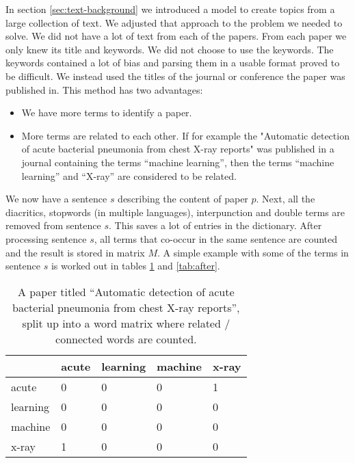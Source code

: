 
In section \ref{sec:text-background} we introduced a model to create topics from a large collection of text. We adjusted that approach to the problem we needed to solve. We did not have a lot of text from each of the papers. From each paper we only knew its title and keywords.
We did not choose to use the keywords.
The keywords contained a lot of bias and parsing them in a usable format proved to be difficult.
We instead used the titles of the journal or conference the paper was published in.
This method has two advantages:

\begin{itemize}
\item[1] We have more terms to identify a paper.
\item[2] More terms are related to each other. If for example the "Automatic detection of acute bacterial pneumonia from chest X-ray reports" was published in a journal containing the terms ``machine learning'', then the terms ``machine learning'' and ``X-ray'' are considered to be related. 
\end{itemize}

We now have a sentence $s$ describing the content of paper $p$.
Next, all the diacritics, stopwords (in multiple languages), interpunction and double terms are removed from sentence $s$.
This saves a lot of entries in the dictionary\cite{chowdhury2010introduction}.
After processing sentence $s$, all terms that co-occur in the same sentence are counted and the result is stored in matrix $M$.
A simple example with some of the terms in sentence $s$ is worked out in tables \ref{tab:before} and \ref{tab:after}.

\begin{table}
	\begin{center}
	

\begin{tabular}{|l|l|l|l|l|}
\hline
	 	& acute  & learning & machine &  x-ray \\ \hline
acute 	&	0 	& 	0 &	 0 &  1	 \\ \hline
learning&	0	&	0 &	 0 &  0	 \\ \hline
machine &	0	&	0 &	 0 &  0	 \\ \hline
x-ray	&	1	&	0 &	 0 &  0	 \\ \hline

\end{tabular} 
	\end{center}
	\caption{A paper titled ``Automatic detection of acute bacterial pneumonia from chest X-ray reports'', split up into a word matrix where related / connected words are counted.}
	\label{tab:before}
\end{table}


